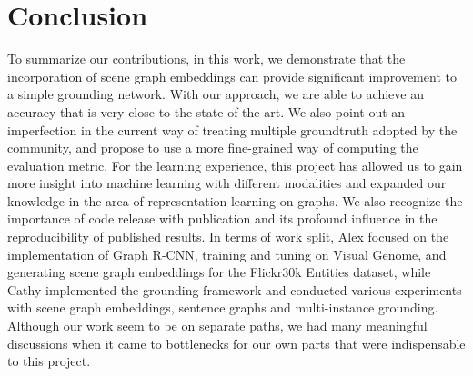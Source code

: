 \section{Conclusion}
To summarize our contributions, in this work, we demonstrate that the incorporation of scene graph embeddings can provide significant improvement to a simple grounding network. With our approach, we are able to achieve an accuracy that is very close to the state-of-the-art. We also point out an imperfection in the current way of treating multiple groundtruth adopted by the community, and propose to use a more fine-grained way of computing the evaluation metric. For the learning experience, this project has allowed us to gain more insight into machine learning with different modalities and expanded our knowledge in the area of representation learning on graphs. We also recognize the importance of code release with publication and its profound influence in the reproducibility of published results. In terms of work split, Alex focused on the implementation of Graph R-CNN, training and tuning on Visual Genome, and generating scene graph embeddings for the Flickr30k Entities dataset, while Cathy implemented the grounding framework and conducted various experiments with scene graph embeddings, sentence graphs and multi-instance grounding. Although our work seem to be on separate paths, we had many meaningful discussions when it came to bottlenecks for our own parts that were indispensable to this project.